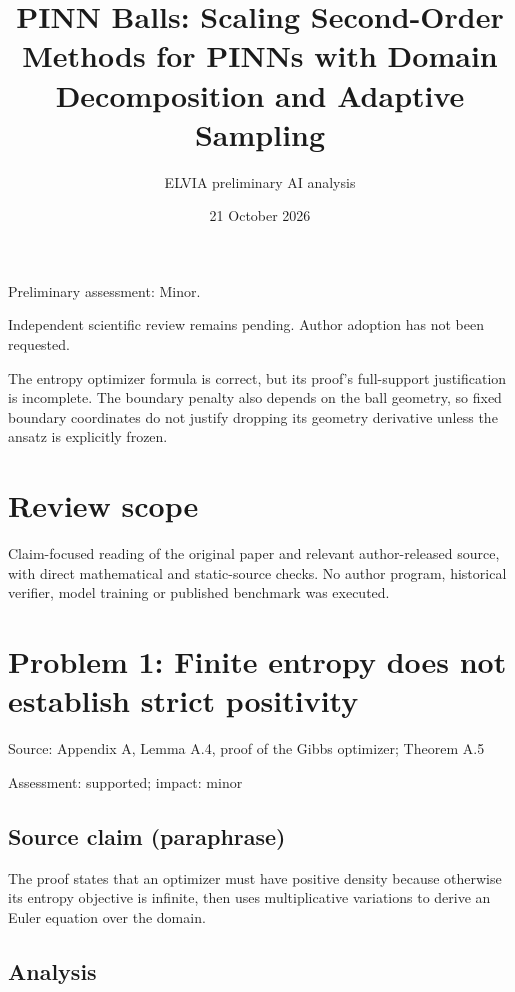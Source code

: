 \documentclass[11pt]{article}
\begin{document}
\title{PINN Balls: Scaling Second-Order Methods for PINNs with Domain Decomposition and Adaptive Sampling}

\author{ELVIA preliminary AI analysis}\date{21 October 2026}\maketitle

Preliminary assessment: Minor.\par

Independent scientific review remains pending. Author adoption has not been requested.

The entropy optimizer formula is correct, but its proof’s full-support justification is incomplete. The boundary penalty also depends on the ball geometry, so fixed boundary coordinates do not justify dropping its geometry derivative unless the ansatz is explicitly frozen.

\section*{Review scope}

Claim-focused reading of the original paper and relevant author-released source, with direct mathematical and static-source checks. No author program, historical verifier, model training or published benchmark was executed.

\section*{Problem 1: Finite entropy does not establish strict positivity}

Source: Appendix A, Lemma A.4, proof of the Gibbs optimizer; Theorem A.5

Assessment: supported; impact: minor

\subsection*{Source claim (paraphrase)}

The proof states that an optimizer must have positive density because otherwise its entropy objective is infinite, then uses multiplicative variations to derive an Euler equation over the domain.

\subsection*{Analysis}
\end{document}
